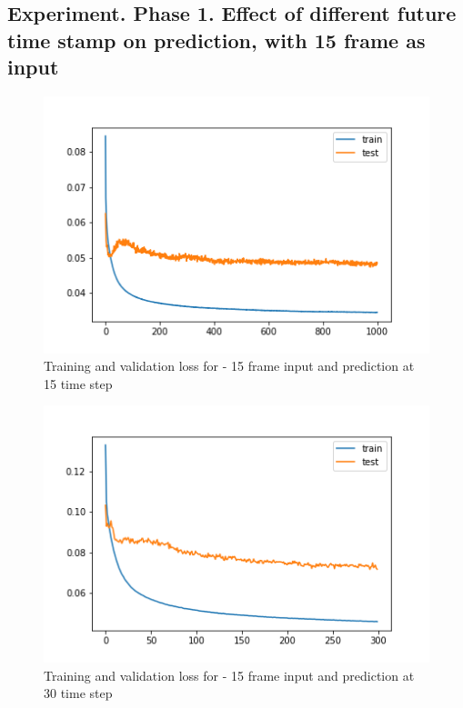 \subsection{Experiment. Phase 1. Effect of different future time stamp on prediction, with 15 frame as input}
\begin{figure}[H] \label{15-15}
\includegraphics[scale=0.75]{conf7_1000e_15ffuture}
\begin{center}
\caption{Training and validation loss for - 15 frame input and prediction at 15 time step }
\end{center}
\end{figure}

\begin{figure}[H] \label{15-30}
\includegraphics[scale=0.75]{conf8_300e_30ffuture}
\begin{center}
\caption{Training and validation loss for - 15 frame input and prediction at 30 time step }
\end{center}
\end{figure}

